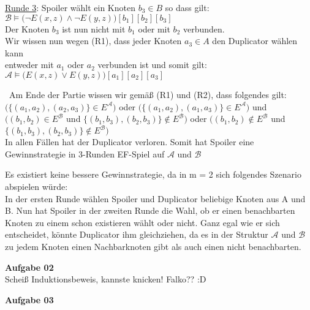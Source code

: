 \documentclass[a4paper,10pt]{article}
\begin{document}
\begin{compactenum} [(a)]
\begin{tabbing}
			\underline{Runde 3}: Spoiler wählt ein Knoten $ b_3 \in B $ so dass gilt:\\
			\> $ \mathcal{B} \models \big(\lnot E(x,z) \wedge \lnot E(y,z)\big) [b_1][b_2][b_3] $\\
			\> Der Knoten $ b_3 $ ist nun nicht mit $ b_1 $ oder mit $ b_2 $ verbunden.\\
			\> Wir wissen nun wegen (R1), dass jeder Knoten $ a_3 \in A $ den Duplicator wählen kann \\
			\> entweder mit $ a_1 $ oder $ a_2 $ verbunden ist und somit gilt: \\
			\> $\mathcal{A} \models \big(E(x,z) \vee E(y,z)\big) [a_1][a_2][a_3]$\\
		\end{tabbing}\
		Am Ende der Partie wissen wir gemäß (R1) und (R2), dass folgendes gilt:\\
		$ \big(\{(a_1,a_2),(a_2,a_3)\}\in E^\mathcal{A}\big) $ oder $ \big(\{(a_1,a_2),(a_1,a_3)\}\in E^\mathcal{A}\big) $ und\\
		$ \big((b_1,b_2)\in E^\mathcal{B}$ und $\{(b_1,b_3),(b_2,b_3)\} \not\in E^\mathcal{B}\big) $ oder $ \big((b_1,b_2)\not\in E^\mathcal{B}$ und $\{(b_1,b_3),(b_2,b_3)\} \not\in E^\mathcal{B}\big) $\\
		
		In allen Fällen hat der Duplicator verloren. Somit hat Spoiler eine Gewinnstrategie in 3-Runden EF-Spiel auf $\mathcal{A}$ und $\mathcal{B}$\\
		
		\item Es existiert keine bessere Gewinnstrategie, da in m = 2 sich folgendes Szenario abspielen würde:\\
		In der ersten Runde wählen Spoiler und Duplicator beliebige Knoten aus A und B. Nun hat Spoiler in der zweiten Runde die Wahl, ob er einen benachbarten Knoten zu einem schon existieren wählt oder nicht. Ganz egal wie er sich entscheidet, könnte Duplicator ihm gleichziehen, da es in der Struktur $ \mathcal{A} $ und $ \mathcal{B} $ zu jedem Knoten einen Nachbarknoten gibt als auch einen nicht benachbarten. 
	\end{compactenum}
	\newpage
	
	\textbf{Aufgabe 02}\\
	Scheiß Induktionsbeweis, kannste knicken! Falko?? :D
	
	\newpage
	
	\textbf{Aufgabe 03}\\
	
\end{document}
